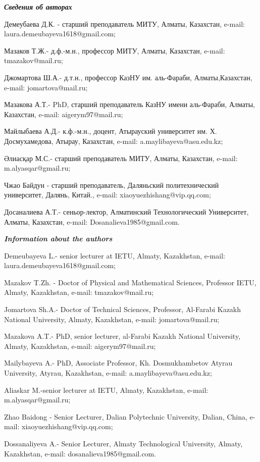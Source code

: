 \begin{info}
\hspace{1em}\emph{{\bfseries Сведения об авторах}}

Демеубаева Д.К. - старший преподаватель МИТУ, Алматы, Казахстан, e-mail:
laura.demeubayeva1618@gmail.com;

Мазаков Т.Ж.- д.ф.-м.н., профессор МИТУ, Алматы, Казахстан, e-mail:
tmazakov@mail.ru;

Джомартова Ш.А.- д.т.н., профессор КазНУ им. аль-Фараби,
Алматы,Казахстан, e-mail:
jomartova@mail.ru;

Мазакова А.Т.- PhD, старший преподаватель КазНУ имени аль-Фараби,
Алматы, Казахстан, e-mail:
aigerym97@mail.ru;

Майлыбаева А.Д.- к.ф.-м.н., доцент, Атырауский университет им. Х.
Досмухамедова, Атырау, Казахстан, e-mail:
a.maylibayeva@asu.edu.kz;

Әлиасқар М.С.- старший преподаватель МИТУ, Алматы, Казахстан, e-mail:
m.alyasqar@gmail.ru;

Чжао Байдун - старший преподаватель, Даляньский политехнический
университет, Далянь, Китай., e-mail: xiaoyuezhishang@vip.qq.com;

Досаналиева А.Т.- сеньор-лектор, Алматинский Технологический
Университет, Алматы, Казахстан, e-mail: Dosanalieva1985@gmail.com.

\hspace{1em}\emph{{\bfseries Information about the authors}}

Demeubayeva L.- senior lecturer at IETU, Almaty, Kazakhstan, e-mail:
laura.demeubayeva1618@gmail.com;

Mazakov T.Zh. - Doctor of Physical and Mathematical Sciences, Professor
IETU, Almaty, Kazakhstan, e-mail: tmazakov@mail.ru;

Jomartova Sh.A.- Doctor of Technical Sciences, Professor, Al-Farabi
Kazakh National University, Almaty, Kazakhstan, e-mail:
jomartova@mail.ru;

Mazakova A.T.- PhD, senior lecturer, al-Farabi Kazakh National
University, Almaty, Kazakhstan, e-mail: aigerym97@mail.ru;

Mailybayeva A.- PhD, Associate Professor, Kh. Dosmukhambetov Atyrau
University, Atyrau, Kazakhstan, e-mail:
a.maylibayeva@asu.edu.kz;

Aliaskar M.-senior lecturer at IETU, Almaty, Kazakhstan, e-mail:
m.alyasqar@gmail.ru;

Zhao Baidong - Senior Lecturer, Dalian Polytechnic University,
Dalian, China, e-mail: xiaoyuezhishang@vip.qq.com;

Dossanaliyeva A.- Senior Lecturer, Almaty Technological University,
Almaty, Kazakhstan, e-mail: dosanalieva1985@gmail.com.
\end{info}
